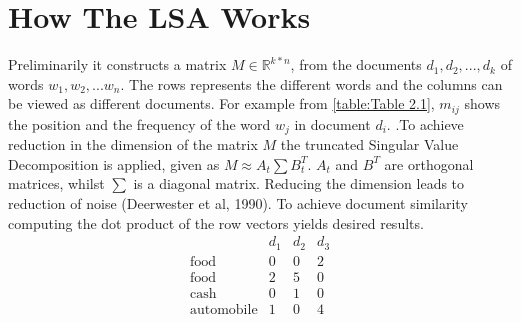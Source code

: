 \section{How The LSA Works}
Preliminarily it constructs a matrix $M\in \mathbb{R}^{k*n}$, from the documents $d_1, d_2,..., d_k$ of words $w_1, w_2, ... w_n$. The rows represents the different words and the columns can be viewed as different documents. For example from \eqref{table:Table 2.1}, $m_{ij}$ shows the position and the frequency of the word $w_j$ in document $d_i$.
.To achieve reduction in the dimension of the matrix $M$ the truncated Singular Value Decomposition is applied, given as $M\approx A_t \sum B^{T}_t.$
$A_t$ and $B^T$ are orthogonal matrices, whilst $ \sum$ is a diagonal matrix.
Reducing the dimension leads to reduction of noise (Deerwester et al, 1990).
To achieve document similarity computing the dot product of the row vectors yields desired results.
$$\begin{array}{cccc}
 &d_1 & d_2 &d_3 \\ 
 \text{food} & 0 & 0 & 2 \\ 
 \text{food} & 2 & 5 & 0 \\ 
 \text{cash} & 0 & 1 & 0 \\ 
 \text{automobile} & 1 & 0 & 4
\end{array} $$
